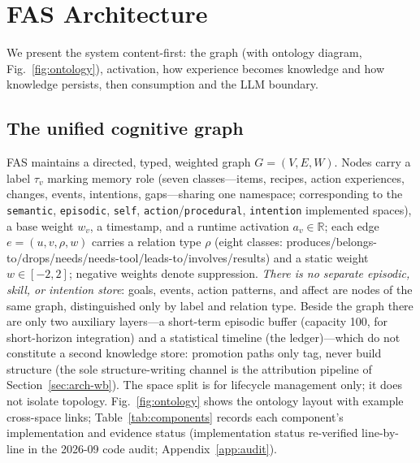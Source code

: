 \documentclass[10pt,a4paper]{article}
\begin{document}
\section{FAS Architecture}
\label{sec:arch}

We present the system content-first: the graph (with ontology diagram, Fig.~\ref{fig:ontology}), activation, how experience becomes knowledge and how knowledge persists, then consumption and the LLM boundary.

\subsection{The unified cognitive graph}
\label{sec:arch-graph}
FAS maintains a directed, typed, weighted graph $G=(V,E,W)$. Nodes carry a label $\tau_v$ marking memory role (seven classes---items, recipes, action experiences, changes, events, intentions, gaps---sharing one namespace; corresponding to the \texttt{semantic}, \texttt{episodic}, \texttt{self}, \texttt{action}/\texttt{procedural}, \texttt{intention} implemented spaces), a base weight $w_v$, a timestamp, and a runtime activation $a_v\in\mathbb{R}$; each edge $e=(u,v,\rho,w)$ carries a relation type $\rho$ (eight classes: produces/belongs-to/drops/needs/needs-tool/leads-to/involves/results) and a static weight $w\in[-2,2]$; negative weights denote suppression. \emph{There is no separate episodic, skill, or intention store}: goals, events, action patterns, and affect are nodes of the same graph, distinguished only by label and relation type. Beside the graph there are only two auxiliary layers---a short-term episodic buffer (capacity 100, for short-horizon integration) and a statistical timeline (the ledger)---which do not constitute a second knowledge store: promotion paths only tag, never build structure (the sole structure-writing channel is the attribution pipeline of Section~\ref{sec:arch-wb}). The space split is for lifecycle management only; it does not isolate topology. Fig.~\ref{fig:ontology} shows the ontology layout with example cross-space links; Table~\ref{tab:components} records each component's implementation and evidence status (implementation status re-verified line-by-line in the 2026-09 code audit; Appendix~\ref{app:audit}).
\end{document}
